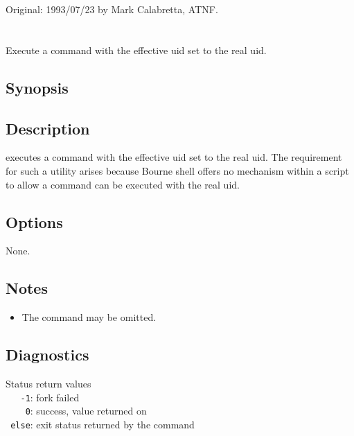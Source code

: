 Original: 1993/07/23 by Mark Calabretta, ATNF.

 
\newpage
\section{}
\label{asme}
 
Execute a command with the effective uid set to the real uid.

\subsection*{Synopsis}
 
\begin{synopsis}
\end{synopsis}
 
\subsection*{Description}
 
 executes a command with the effective uid set to the real uid.  The
requirement for such a utility arises because Bourne shell offers no mechanism
within a  script to allow a command can be executed with the real
uid.
 
\subsection*{Options}
 
None.
 
\subsection*{Notes}
 
\begin{itemize}
\item
   The command may be omitted.
\end{itemize}
 
\subsection*{Diagnostics}
 
Status return values
\\ \verb+   -1+:  fork failed
\\ \verb+    0+:  success, value returned on 
\\ \verb+ else+:  exit status returned by the command
 
